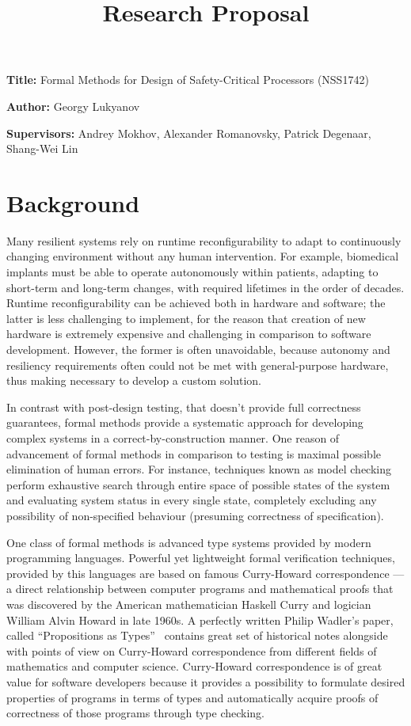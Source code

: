 \documentclass[10pt, a4paper]{article}
\title{Research Proposal}
\author{}
\date{}
\newcommand{\namelistlabel}[1]{\mbox{#1}\hfil}
\newenvironment{namelist}[1]{%
\begin{list}{}
    {
        \let\makelabel\namelistlabel
        \settowidth{\labelwidth}{#1}
        \setlength{\leftmargin}{1.1\labelwidth}
    }
  }{%
\end{list}}
\begin{document}
\maketitle

\begin{namelist}{xxxxxxxxxxxx}
\item[{\bf Title:}]
  Formal Methods for Design of Safety-Critical Processors (NSS1742)
\item[{\bf Author:}]
  Georgy Lukyanov
\item[{\bf Supervisors:}]
  Andrey Mokhov, Alexander Romanovsky, Patrick Degenaar, Shang-Wei Lin
\end{namelist}

\section{Background} 

Many resilient systems rely on runtime reconfigurability
to adapt to continuously changing environment without any
human intervention. For example, biomedical implants must
be able to operate autonomously within patients, adapting
to short-term and long-term changes, with required lifetimes
in the order of decades. Runtime reconfigurability can be
achieved both in hardware and software; the latter is less challenging 
to implement, for the reason that creation of new hardware is extremely 
expensive and challenging in comparison to software development. However, the
former is often unavoidable, because autonomy and resiliency requirements often
could not be met with general-purpose hardware, thus making necessary to
develop a custom solution.

In contrast with post-design testing, that doesn't provide full correctness
guarantees, formal methods provide a systematic approach for developing complex
systems in a correct-by-construction manner. One reason of advancement of formal
methods in comparison to testing is maximal possible elimination of human errors.
For instance, techniques known as model checking perform exhaustive search through
entire space of possible states of the system and evaluating system status in
every single state, completely excluding any possibility of non-specified
behaviour (presuming correctness of specification).

One class of formal methods is advanced type systems provided by modern
programming languages. Powerful yet lightweight formal verification techniques,
provided by this languages are based on famous Curry-Howard correspondence ---
a direct relationship between computer programs and mathematical proofs that
was discovered by the American mathematician Haskell Curry and logician William
Alvin Howard in late 1960s. A perfectly written Philip Wadler's paper, called
``Propositions as Types''~\cite{Wadler:2015:PT:2847579.2699407} contains great
set of historical notes alongside with
points of view on Curry-Howard correspondence from different fields of
mathematics and computer science. 
Curry-Howard correspondence is of great value for software developers because
it provides a possibility to formulate desired
properties of programs in terms of types and automatically acquire proofs of
correctness of those programs through type checking.
\end{document}
